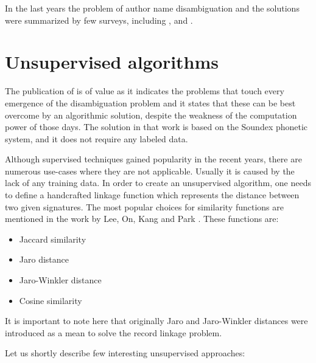 \documentclass{pracamgr}
\begin{document}
In the last years the problem of author name disambiguation and the solutions were summarized
by few surveys, including \citep{Klaas}, \citep{smalheiser2009author} and
\citep{Ferreira:survey}.

\section{Unsupervised algorithms}

The publication of \citep{Newcombe} is of value as it indicates the problems that touch
every emergence of the disambiguation problem and it states that these can be best
overcome by an algorithmic solution, despite the weakness of the computation power of
those days. The solution in that work is based on the Soundex phonetic system, and it
does not require any labeled data.

Although supervised techniques gained popularity in the recent years, there are numerous
use-cases where they are not applicable. Usually it is caused by the lack of any training
data. In order to create an unsupervised algorithm, one needs to define a
handcrafted linkage function which represents the distance between two given signatures.
The most popular choices for similarity functions are mentioned in the work by Lee, On, Kang
and Park \citep{Lee}. These functions are:

\begin{itemize}

\item{Jaccard similarity \citep{Jaccard}}
\item{Jaro distance \citep{jaro}}
\item{Jaro-Winkler distance \citep{winkler}}
\item{Cosine similarity}

\end{itemize}

It is important to note here that originally Jaro and Jaro-Winkler distances were introduced
as a mean to solve the record linkage problem.

Let us shortly describe few interesting unsupervised approaches:
\end{document}
